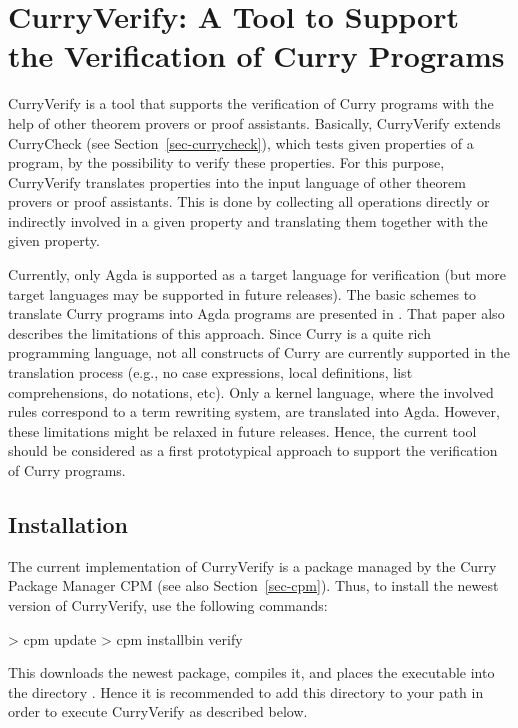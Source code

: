 \section{CurryVerify: A Tool to Support the Verification of Curry Programs}
\label{sec-curry2verify}

CurryVerify
is a tool that supports the verification of Curry programs
with the help of other theorem provers or proof assistants.
Basically, CurryVerify extends CurryCheck (see Section~\ref{sec-currycheck}),
which tests given properties of a program,
by the possibility to verify these properties.
For this purpose, CurryVerify translates properties
into the input language of other theorem provers or proof assistants.
This is done by collecting all operations directly or indirectly
involved in a given property and translating them together with
the given property.

Currently, only Agda \cite{Norell09} is supported as
a target language for verification (but more target languages
may be supported in future releases).
The basic schemes to translate Curry programs into Agda programs
are presented in \cite{AntoyHanusLibby17EPTCS}.
That paper also describes the limitations of this approach.
Since Curry is a quite rich programming language,
not all constructs of Curry are currently supported
in the translation process (e.g., no case expressions,
local definitions, list comprehensions, do notations, etc).
Only a kernel language, where the involved rules
correspond to a term rewriting system, are translated into Agda.
However, these limitations might be relaxed in future releases.
Hence, the current tool should be considered as a first prototypical
approach to support the verification of Curry programs.

\subsection{Installation}

The current implementation of CurryVerify is a package
managed by the Curry Package Manager CPM
(see also Section~\ref{sec-cpm}).
Thus, to install the newest version of CurryVerify, use the following commands:
%
\begin{curry}
> cpm update
> cpm installbin verify
\end{curry}
%
This downloads the newest package, compiles it, and places
the executable  into the directory .
Hence it is recommended to add this directory to your path
in order to execute CurryVerify as described below.

